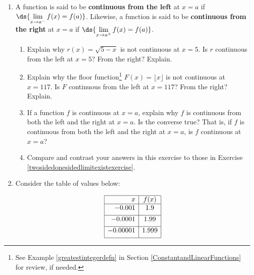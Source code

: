 \documentclass{ximera}
\begin{document}
\begin{enumerate}
\item\label{onesidedcontinuityexercise}  A function is said to be \textbf{continuous from the left} at $x=a$ if $\ds{\lim_{x \rightarrow a^{-}} f(x) = f(a)}$.  Likewise, a function is said to be \textbf{continuous from the right} at $x=a$ if $\ds{\lim_{x \rightarrow a^{+}} f(x) = f(a)}$.

\begin{enumerate}

\item   Explain why $r(x) = \sqrt{5-x}$ is not continuous at $x = 5$.  Is $r$ continuous from the left at $x=5$?  From the right?  Explain.

\item  Explain why the floor function\footnote{See Example \ref{greatestintegerdefn} in Section \ref{ConstantandLinearFunctions} for review, if needed.} $F(x) = \lfloor x \rfloor$ is not continuous at $x = 117$.   Is $F$ continuous from the left at $x=117$?  From the right?  Explain.

\item  If a function $f$ is continuous at $x = a$, explain why $f$ is continuous from both the left and the right at $x = a$.  Is the converse true?  That is, if $f$ is continuous from both the left and the right at $x = a$, is $f$ continuous at $x=a$?  

\item  Compare and contrast your answers in this exercise to those in Exercise \ref{twosidedonesidedlimitexistexercise}.


\end{enumerate}


\item  Consider the table of values below:

\[ \begin{array}{|r|c|} 

\hline

x & f(x)  \\    \hline 

-0.001  &  1.9 \\   [1ex]  \hline 

-0.0001 & 1.99 \\ [1ex]  \hline

-0.00001 & 1.999\\  [1ex] \hline


\end{array}\]
\end{enumerate}
\end{document}

